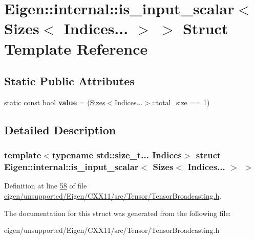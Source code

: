 \hypertarget{struct_eigen_1_1internal_1_1is__input__scalar_3_01_sizes_3_01_indices_8_8_8_01_4_01_4}{}\section{Eigen\+:\+:internal\+:\+:is\+\_\+input\+\_\+scalar$<$ Sizes$<$ Indices... $>$ $>$ Struct Template Reference}
\label{struct_eigen_1_1internal_1_1is__input__scalar_3_01_sizes_3_01_indices_8_8_8_01_4_01_4}
\subsection*{Static Public Attributes}
\begin{DoxyCompactItemize}
\item 
\mbox{\label{struct_eigen_1_1internal_1_1is__input__scalar_3_01_sizes_3_01_indices_8_8_8_01_4_01_4_acd40b6ea6e948e75532d83f9f3972e10}} 
static const bool {\bfseries value} = (\hyperlink{struct_eigen_1_1_sizes}{Sizes}$<$Indices...$>$\+::total\+\_\+size == 1)
\end{DoxyCompactItemize}


\subsection{Detailed Description}
\subsubsection*{template$<$typename std\+::size\+\_\+t... Indices$>$\newline
struct Eigen\+::internal\+::is\+\_\+input\+\_\+scalar$<$ Sizes$<$ Indices... $>$ $>$}



Definition at line \hyperlink{eigen_2unsupported_2_eigen_2_c_x_x11_2src_2_tensor_2_tensor_broadcasting_8h_source_l00058}{58} of file \hyperlink{eigen_2unsupported_2_eigen_2_c_x_x11_2src_2_tensor_2_tensor_broadcasting_8h_source}{eigen/unsupported/\+Eigen/\+C\+X\+X11/src/\+Tensor/\+Tensor\+Broadcasting.\+h}.



The documentation for this struct was generated from the following file\+:\begin{DoxyCompactItemize}
\item 
eigen/unsupported/\+Eigen/\+C\+X\+X11/src/\+Tensor/\+Tensor\+Broadcasting.\+h\end{DoxyCompactItemize}
